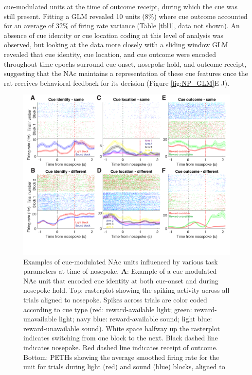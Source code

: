 \documentclass[11pt]{article}
\newcommand{\bsf}[1]{\textbf{#1}}
\begin{document}
{cue-modulated units at the time of outcome receipt, during which the cue was
still present. Fitting a GLM revealed 10 units (8\%) where cue outcome accounted
for an average of 32\% of firing rate variance (Table \ref{tbl1}, data not
shown). An absence of cue identity or cue location coding at this level of analysis was observed,
but looking at the data more closely with a sliding window GLM revealed that
cue identity, cue location, and cue outcome were encoded throughout time epochs surround cue-onset, nosepoke hold, and outcome receipt,
suggesting that the NAc maintains a representation of these cue features once the rat receives behavioral feedback for its decision (Figure \ref{fig:NP_GLM}E-J).

\begin{figure}[h]
\centering
\includegraphics[width=\textwidth]{Fig 9 - NP Neural examples.png}
\caption{Examples of cue-modulated NAc units influenced by various task
parameters at time of nosepoke. \bsf{A}: Example of a cue-modulated NAc unit
that encoded cue identity at both cue-onset and during nosepoke hold. Top:
rasterplot showing the spiking activity across all trials aligned to
nosepoke. Spikes across trials are color coded according to cue type (red:
reward-available light; green: reward-unavailable light; navy blue:
reward-available sound; light blue: reward-unavailable sound). White space
halfway up the rasterplot indicates switching from one block to the
next. Black dashed line indicates nosepoke. Red dashed line indicates receipt
of outcome. Bottom: PETHs showing the average smoothed firing rate for the
unit for trials during light (red) and sound (blue) blocks, aligned to
}
\end{figure}}
\end{document}

